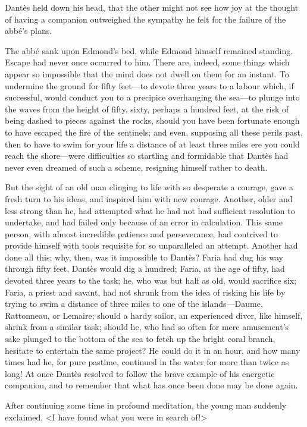  Dantès held down his head, that the other might not see how joy at the thought of having a companion outweighed the sympathy he felt for the failure of the abbé's plans. 

 The abbé sank upon Edmond's bed, while Edmond himself remained standing. Escape had never once occurred to him. There are, indeed, some things which appear so impossible that the mind does not dwell on them for an instant. To undermine the ground for fifty feet—to devote three years to a labour which, if successful, would conduct you to a precipice overhanging the sea—to plunge into the waves from the height of fifty, sixty, perhaps a hundred feet, at the risk of being dashed to pieces against the rocks, should you have been fortunate enough to have escaped the fire of the sentinels; and even, supposing all these perils past, then to have to swim for your life a distance of at least three miles ere you could reach the shore—were difficulties so startling and formidable that Dantès had never even dreamed of such a scheme, resigning himself rather to death. 

 But the sight of an old man clinging to life with so desperate a courage, gave a fresh turn to his ideas, and inspired him with new courage. Another, older and less strong than he, had attempted what he had not had sufficient resolution to undertake, and had failed only because of an error in calculation. This same person, with almost incredible patience and perseverance, had contrived to provide himself with tools requisite for so unparalleled an attempt. Another had done all this; why, then, was it impossible to Dantès? Faria had dug his way through fifty feet, Dantès would dig a hundred; Faria, at the age of fifty, had devoted three years to the task; he, who was but half as old, would sacrifice six; Faria, a priest and savant, had not shrunk from the idea of risking his life by trying to swim a distance of three miles to one of the islands—Daume, Rattonneau, or Lemaire; should a hardy sailor, an experienced diver, like himself, shrink from a similar task; should he, who had so often for mere amusement's sake plunged to the bottom of the sea to fetch up the bright coral branch, hesitate to entertain the same project? He could do it in an hour, and how many times had he, for pure pastime, continued in the water for more than twice as long! At once Dantès resolved to follow the brave example of his energetic companion, and to remember that what has once been done may be done again. 

 After continuing some time in profound meditation, the young man suddenly exclaimed, <I have found what you were in search of!> 

